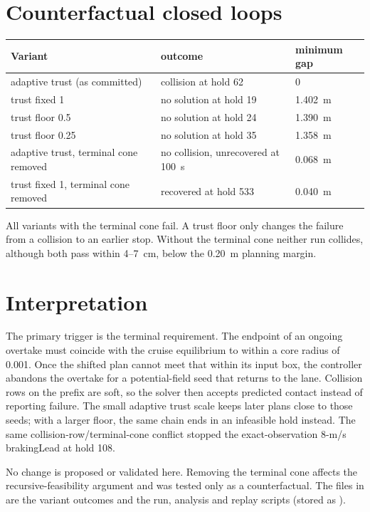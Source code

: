 \documentclass[11pt]{article}
\begin{document}
\section{Counterfactual closed loops}
\begin{center}
\begin{tabular}{lll}
\toprule
Variant & outcome & minimum gap\\
\midrule
adaptive trust (as committed) & collision at hold 62 & 0\\
trust fixed 1 & no solution at hold 19 & 1.402~m\\
trust floor 0.5 & no solution at hold 24 & 1.390~m\\
trust floor 0.25 & no solution at hold 35 & 1.358~m\\
adaptive trust, terminal cone removed & no collision, unrecovered at 100~s & 0.068~m\\
trust fixed 1, terminal cone removed & recovered at hold 533 & 0.040~m\\
\bottomrule
\end{tabular}
\end{center}

All variants with the terminal cone fail. A trust floor only changes the
failure from a collision to an earlier stop. Without the terminal cone neither
run collides, although both pass within 4--7~cm, below the 0.20~m planning
margin.

\section{Interpretation}
The primary trigger is the terminal requirement. The endpoint of an ongoing
overtake must coincide with the cruise equilibrium to within a core radius of
0.001. Once the shifted plan cannot meet that within its input box, the
controller abandons the overtake for a potential-field seed that returns to
the lane. Collision rows on the prefix are soft, so the solver then accepts
predicted contact instead of reporting failure. The small adaptive trust
scale keeps later plans close to those seeds; with a larger floor, the same
chain ends in an infeasible hold instead. The same collision-row/terminal-cone
conflict stopped the exact-observation 8-m/s brakingLead at hold 108.

No change is proposed or validated here. Removing the terminal cone affects
the recursive-feasibility argument and was tested only as a counterfactual.
The files in  are the variant outcomes and
the run, analysis and replay scripts (stored as ).
\end{document}
